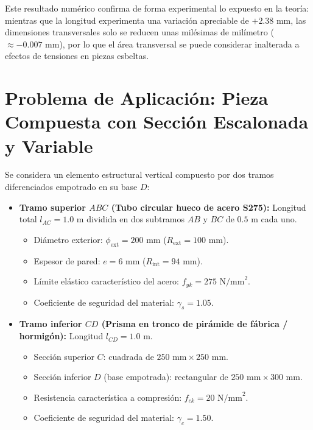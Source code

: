 Este resultado numérico confirma de forma experimental lo expuesto en la teoría: mientras que la longitud experimenta una variación apreciable de $+2.38\text{ mm}$, las dimensiones transversales solo se reducen unas milésimas de milímetro ($\approx -0.007\text{ mm}$), por lo que el área transversal se puede considerar inalterada a efectos de tensiones en piezas esbeltas.

\section{Problema de Aplicación: Pieza Compuesta con Sección Escalonada y Variable}

\begin{tcolorbox}[colback=blue!5!white,colframe=blue!75!black,title=\textbf{Problema 8: Barra Compuesta (Tubo de Acero y Tronco de Pirámide) bajo Compresión}]
    Se considera un elemento estructural vertical compuesto por dos tramos diferenciados empotrado en su base $D$:
    \begin{itemize}
        \item \textbf{Tramo superior $ABC$ (Tubo circular hueco de acero S275):} Longitud total $l_{AC} = 1.0\text{ m}$ dividida en dos subtramos $AB$ y $BC$ de $0.5\text{ m}$ cada uno.
              \begin{itemize}
                  \item Diámetro exterior: $\phi_{\text{ext}} = 200\text{ mm}$ ($R_{\text{ext}} = 100\text{ mm}$).
                  \item Espesor de pared: $e = 6\text{ mm}$ ($R_{\text{int}} = 94\text{ mm}$).
                  \item Límite elástico característico del acero: $f_{yk} = 275\text{ N/mm}^2$.
                  \item Coeficiente de seguridad del material: $\gamma_s = 1.05$.
              \end{itemize}
        \item \textbf{Tramo inferior $CD$ (Prisma en tronco de pirámide de fábrica / hormigón):} Longitud $l_{CD} = 1.0\text{ m}$.
              \begin{itemize}
                  \item Sección superior $C$: cuadrada de $250\text{ mm} \times 250\text{ mm}$.
                  \item Sección inferior $D$ (base empotrada): rectangular de $250\text{ mm} \times 300\text{ mm}$.
                  \item Resistencia característica a compresión: $f_{ck} = 20\text{ N/mm}^2$.
                  \item Coeficiente de seguridad del material: $\gamma_c = 1.50$.
              \end{itemize}
    \end{itemize}


\end{tcolorbox}
